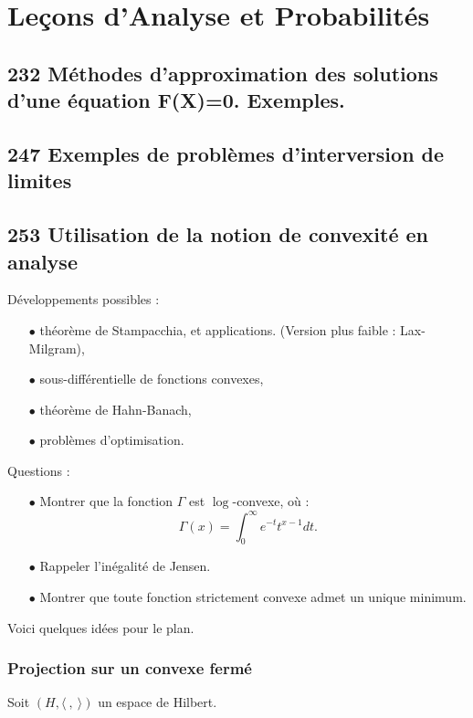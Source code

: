 \section{Leçons d'Analyse et Probabilités}

\subsection{232 Méthodes d'approximation des solutions d'une équation F(X)=0. Exemples.}
\subsection{247 Exemples de problèmes d'interversion de limites}

\subsection{253 Utilisation de la notion de convexité en analyse}

Développements possibles :\\
\begin{itemize}
\item[$\bullet$] théorème de Stampacchia, et applications. (Version plus faible : Lax-Milgram),
\item[$\bullet$] sous-différentielle de fonctions convexes,
\item[$\bullet$] théorème de Hahn-Banach,
\item[$\bullet$] problèmes d'optimisation.\\
\end{itemize}

Questions :\\
\begin{itemize}
\item[$\bullet$] Montrer que la fonction $\Gamma$ est $\log$-convexe, où : \[\Gamma(x)=\int_0^\infty e^{-t}t^{x-1}dt.\]
\item[$\bullet$] Rappeler l'inégalité de Jensen.
\item[$\bullet$] Montrer que toute fonction strictement convexe admet un unique minimum.\\
\end{itemize}

Voici quelques idées pour le plan.\\

\subsubsection{Projection sur un convexe fermé}
Soit $(H,\langle \ ,\ \rangle)$ un espace de Hilbert. 

